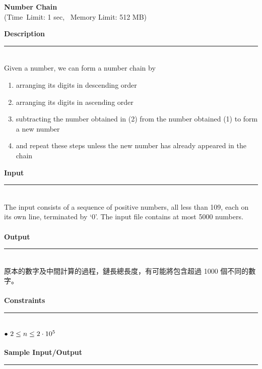 \documentclass{article}
\begin{document}
    \begin{center} 
        {\LARGE \textbf{Number Chain}}
        \\ {\large (Time\  Limit: 1 sec, \ Memory Limit: 512 MB)}
    \end{center}
    {\Large \textbf {Description}}
    \\\rule[5pt]{18cm}{0.01em}
    \fontsize{12pt}{11pt} \selectfont
    \\Given a number, we can form a number chain by
    \begin{enumerate}
        \item  arranging its digits in descending order
        \item  arranging its digits in ascending order
        \item subtracting the number obtained in (2) from the number obtained (1) to form a new number
        \item and repeat these steps unless the new number has already appeared in the chain
      \end{enumerate}
   {\Large \textbf{Input}} %
    \\ \rule[5pt]{18cm}{0.02em} 
    \\The input consists of a sequence of positive numbers, all less than 109, each on its own line, terminated
    by ‘0’. The input file contains at most 5000 numbers.
    \\\\{ \Large \textbf{Output}} %
    \\\rule[5pt]{18cm}{0.01em} 
    \\原本的數字及中間計算的過程，鏈長總長度，有可能將包含超過 1000 個不同的數字。
    \\\\{ \Large \textbf{Constraints}}
    \\\rule[5pt]{18cm}{0.01em} 
    \\ $ \bullet \  {\Large 2  \leq  n \leq 2 \cdot  10^5  }$
    \\\\{\Large \textbf{Sample  Input/Output}}
    \\\rule[5pt]{18cm}{0.01em}
\end{document}

